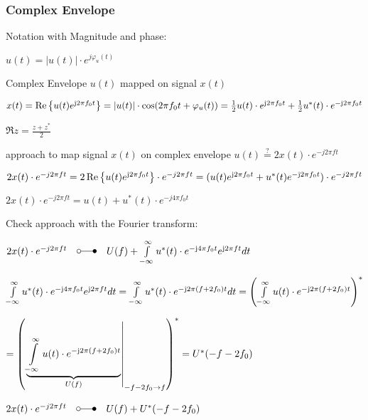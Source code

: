 \subsubsection{Complex Envelope}


Notation with Magnitude and phase:

\quad $u(t)=|u(t)|\cdot e^{j\varphi_u(t)}$

Complex Envelope $u(t)$ mapped on signal $x(t)$ 

\quad $x(t)=\operatorname{Re}\left\{u(t)e^{\mathrm{j} 2 \pi f_0 t}\right\}=|u(t)|\cdot \cos (2\pi f_0 t + \varphi_u(t))=\frac{1}{2}u(t)\cdot e^{\mathrm{j} 2 \pi f_0 t}+\frac{1}{2}u^*(t)\cdot e^{-\mathrm{j} 2 \pi f_0 t}$

\with $\Re{z}=\frac{z+z^*}{2}$

approach to map signal $x(t)$ on complex envelope $u(t)\overset{?}{=}2x(t)\cdot e^{-j2 \pi f t }$  

\quad $2 x(t) \cdot e^{-j2 \pi f t } = 2 \operatorname{Re}\left\{u(t)e^{\mathrm{j} 2 \pi f_0 t}\right\}\cdot e^{-j2 \pi f t } =(u(t)e^{\mathrm{j} 2 \pi f_0 t} +u^*(t)e^{-\mathrm{j} 2 \pi f_0 t})\cdot e^{-j2 \pi f t }$

\quad $2 x(t) \cdot e^{-j2 \pi f t }  = u(t) + u^*(t)\cdot e^{-j4\pi f_0 t}$

Check approach with the Fourier transform:

$2 x(t) \cdot e^{-j2 \pi f t } \quad\laplace\quad U(f)+\int\limits_{-\infty}^{\infty}u^*(t)\cdot e^{-\j 4 \pi f_0 t}e^{\j 2 \pi f t}dt$


\with $\int\limits_{-\infty}^{\infty}u^*(t)\cdot e^{-\mathrm{j} 4 \pi f_0 t}e^{\mathrm{j} 2 \pi f t}dt 
=\int\limits_{-\infty}^{\infty}u^*(t)\cdot e^{-\mathrm{j} 2 \pi (f+2f_0) t}dt
=\left(\int\limits_{-\infty}^{\infty}u(t)\cdot e^{-\mathrm{j} 2 \pi (f+2f_0) t}\right)^*$

\qquad$=\left(\left.\underbrace{\int\limits_{-\infty}^{\infty}u(t)\cdot e^{-\mathrm{j} 2 \pi (f+2f_0) t}}_{U(f)}\right|_{-f-2f_0\to f }\right)^*=U^*(-f-2f_0)$

\pfeil $2 x(t) \cdot e^{-j2 \pi f t } \quad\laplace\quad U(f)+U^*(-f-2f_0)$

